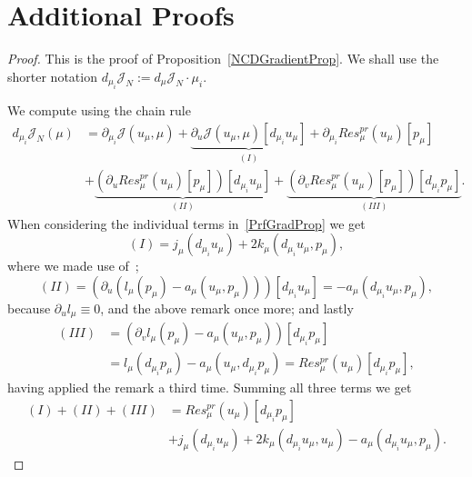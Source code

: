 \appendix

\section{Additional Proofs}\label{sec:Appendix}

\begin{proof}
    This is the proof of Proposition~\ref{NCDGradientProp}. We shall use the shorter notation $d_{\mu_i} \mathcal{J}_N := d_\mu \mathcal{J}_N \cdot \mu_i$.

    We compute using the chain rule
    \begin{align}
        d_{\mu_i} \mathcal{J}_N(\mu) &= \partial_{\mu_i} \mathcal{J}(u_\mu, \mu) + \underbrace{\partial_u \mathcal{J}(u_\mu, \mu)[d_{\mu_i} u_\mu]}_{(I)} + \partial_{\mu_i} Res_\mu^{pr}(u_\mu)[p_\mu] \label{PrfGradProp}\\
        &+ \underbrace{\left( \partial_u Res_\mu^{pr}(u_\mu)[p_\mu] \right)[d_{\mu_i} u_\mu]}_{(II)} + \underbrace{\left( \partial_v Res_\mu^{pr}(u_\mu)[p_\mu] \right)[d_{\mu_i} p_\mu]}_{(III)}. \nonumber
    \end{align}
    When considering the individual terms in~\eqref{PrfGradProp} we get
    \begin{equation}
        (I) = j_\mu(d_{\mu_i} u_\mu) + 2 k_\mu(d_{\mu_i} u_\mu, p_\mu),\label{PrfEqBoth1}
    \end{equation}
    where we made use of~\cite[Remark 2.4]{Keil2021};
    \begin{equation}
        (II) = \left( \partial_u (l_\mu(p_\mu) - a_\mu(u_\mu, p_\mu)) \right)[d_{\mu_i} u_\mu] = -a_\mu(d_{\mu_i} u_\mu, p_\mu),\label{PrfEqBoth2}
    \end{equation}
    because $\partial_u l_\mu \equiv 0$, and the above remark once more; and lastly
    \begin{align}
        (III) &= \left( \partial_v l_\mu(p_\mu) - a_\mu(u_\mu, p_\mu) \right)[d_{\mu_i} p_\mu] \label{PrfEqBoth3}\\
        &= l_\mu(d_{\mu_i} p_\mu) - a_\mu(u_\mu, d_{\mu_i} p_\mu) = Res_\mu^{pr}(u_\mu)[d_{\mu_i} p_\mu], \nonumber
    \end{align}
    having applied the remark a third time.
    Summing all three terms we get
    \begin{align}
        (I) + (II) + (III) &= Res_\mu^{pr}(u_\mu)[d_{\mu_i} p_\mu] \label{PrfEq1}\\
        &+ j_\mu(d_{\mu_i} u_\mu) + 2 k_\mu(d_{\mu_i} u_\mu, u_\mu) - a_\mu(d_{\mu_i} u_\mu, p_\mu). \nonumber
    \end{align}


\end{proof}
